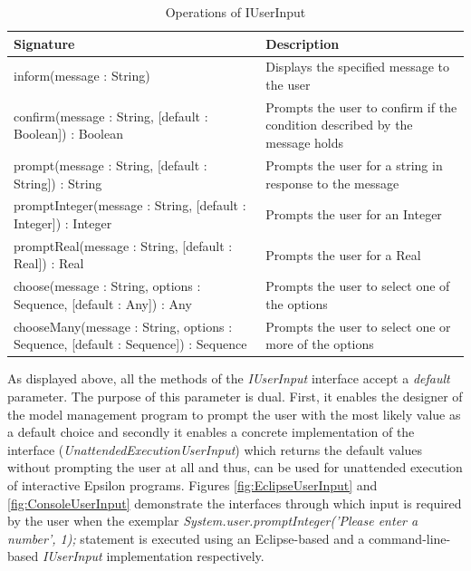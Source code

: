 \begin{longtabu} {|p{6.5cm}|X|}
			
			\caption{Operations of IUserInput}
			\label{tab:IUserInputOperations}\\
			
			\hline
							
			\textbf{Signature} & \textbf{Description} \\\hline

			inform(message : String) & Displays the specified message to the user\\\hline
			
			confirm(message : String, [default : Boolean]) : Boolean & Prompts the user to confirm if the condition described by the message holds \\\hline
			
			prompt(message : String, [default : String]) : String & Prompts the user for a string in response to the message \\\hline
			
			promptInteger(message : String, [default : Integer]) : Integer & Prompts the user for an Integer \\\hline
			
			promptReal(message : String, [default : Real]) : Real & Prompts the user for a Real \\\hline
			
	 		choose(message : String, options : Sequence, [default : Any]) : Any & Prompts the user to select one of the options \\\hline
			
			chooseMany(message : String, options : Sequence, [default : Sequence]) : Sequence & Prompts the user to select one or more of the options \\\hline
			
\end{longtabu}

As displayed above, all the methods of the \emph{IUserInput} interface accept a \emph{default} parameter. The purpose of this parameter is dual. First, it enables the designer of the model management program to prompt the user with the most likely value as a default choice and secondly it enables a concrete implementation of the interface (\emph{UnattendedExecutionUserInput}) which returns the default values without prompting the user at all and thus, can be used for unattended execution of interactive Epsilon programs. Figures \ref{fig:EclipseUserInput} and \ref{fig:ConsoleUserInput} demonstrate the interfaces through which input is required by the user when the exemplar \emph{System.user.promptInteger('Please enter a number', 1);} statement is executed using  an Eclipse-based and a command-line-based \emph{IUserInput} implementation respectively.

